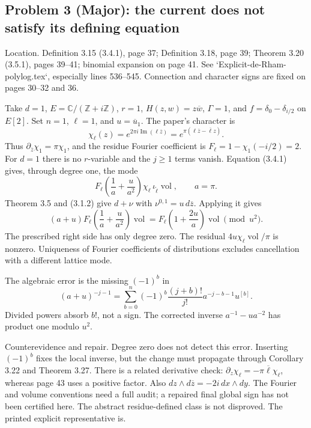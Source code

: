 \documentclass[10pt]{article}
\begin{document}
\subsection*{Problem 3 (Major): the current does not satisfy its defining equation}
Location. Definition 3.15 (3.4.1), page 37; Definition 3.18, page 39; Theorem 3.20 (3.5.1), pages 39–41; binomial expansion on page 41. See `Explicit-de-Rham-polylog.tex`, especially lines 536–545. Connection and character signs are fixed on pages 30–32 and 36.\par
Take \(d=1\), \(E=\mathbb C/(\mathbb Z+i\mathbb Z)\), \(r=1\), \(H(z,w)=z\overline w\), \(\Gamma=1\), and \(f=\delta_0-\delta_{i/2}\) on \(E[2]\). Set \(n=1\), \(\ell=1\), and \(u=\overline u_1\). The paper’s character is \[\chi_\ell(z)=e^{2\pi i\operatorname{Im}(\ell\overline z)}
             =e^{\pi(\ell\overline z-\overline\ell z)}.\] Thus \(\partial_{\overline z}\chi_1=\pi\chi_1\), and the residue Fourier coefficient is \(F_\ell=1-\chi_1(-i/2)=2\). For \(d=1\) there is no \(r\)-variable and the \(j\geq1\) terms vanish. Equation (3.4.1) gives, through degree one, the mode \[F_\ell\left(\frac1a+\frac{u}{a^2}\right)
 \chi_\ell\,\iota_{\widetilde\ell}\operatorname{vol},\qquad a=\pi.\] Theorem 3.5 and (3.1.2) give \(d+\nu\) with \(\nu^{0,1}=u\,d\overline z\). Applying it gives \[(a+u)F_\ell\left(\frac1a+\frac{u}{a^2}\right)\operatorname{vol}
 =F_\ell\left(1+\frac{2u}{a}\right)\operatorname{vol}\pmod{u^2}.\] The prescribed right side has only degree zero. The residual \(4u\chi_\ell\operatorname{vol}/\pi\) is nonzero. Uniqueness of Fourier coefficients of distributions excludes cancellation with a different lattice mode.\par
The algebraic error is the missing \((-1)^b\) in \[(a+u)^{-j-1}=\sum_{b=0}^n
 (-1)^b\frac{(j+b)!}{j!}a^{-j-b-1}u^{[b]}.\] Divided powers absorb \(b!\), not a sign. The corrected inverse \(a^{-1}-ua^{-2}\) has product one modulo \(u^2\).\par
Counterevidence and repair. Degree zero does not detect this error. Inserting \((-1)^b\) fixes the local inverse, but the change must propagate through Corollary 3.22 and Theorem 3.27. There is a related derivative check: \(\partial_z\chi_\ell=-\pi\overline\ell\chi_\ell\), whereas page 43 uses a positive factor. Also \(dz\wedge d\overline z=-2i\,dx\wedge dy\). The Fourier and volume conventions need a full audit; a repaired final global sign has not been certified here. The abstract residue-defined class is not disproved. The printed explicit representative is.\par
\end{document}
